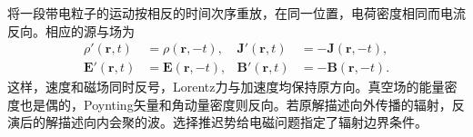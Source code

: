 将一段带电粒子的运动按相反的时间次序重放，在同一位置，电荷密度相同而电流反向。相应的源与场为
\begin{subequations}
    \label{eq:ed-time-reversal-fields}
    \begin{align}
        \rho'(\bm r,t) &= \rho(\bm r,-t),& \bm J'(\bm r,t) &= -\bm J(\bm r,-t),\\
        \bm E'(\bm r,t) &= \bm E(\bm r,-t),&\bm B'(\bm r,t) &= -\bm B(\bm r,-t).
    \end{align}
\end{subequations}
这样，速度和磁场同时反号，Lorentz力与加速度均保持原方向。真空场的能量密度也是偶的，Poynting矢量和角动量密度则反向。若原解描述向外传播的辐射，反演后的解描述向内会聚的波。选择推迟势给电磁问题指定了辐射边界条件。
